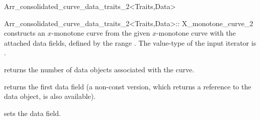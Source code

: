 \begin{ccRefClass}{Arr_consolidated_curve_data_traits_2<Traits,Data>}
\begin{ccClass}{Arr_consolidated_curve_data_traits_2<Traits,Data>::
                X_monotone_curve_2}
    {constructs an $x$-monotone curve from the given  $x$-monotone
     curve with the attached data fields, defined by the range 
     \ccc{[begin,end)}. The value-type of the input iterator is .}

\ccAccessFunctions

  {returns the number of data objects associated with the curve.}

  {returns the first data field (a non-const version, which returns a reference
   to the data object, is also available).
   }


  {sets the data field.}

\end{ccClass}

\end{ccRefClass}

\ccRefPageEnd
